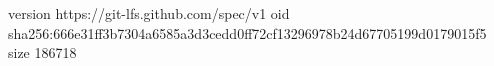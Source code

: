 version https://git-lfs.github.com/spec/v1
oid sha256:666e31ff3b7304a6585a3d3cedd0ff72cf13296978b24d67705199d0179015f5
size 186718
